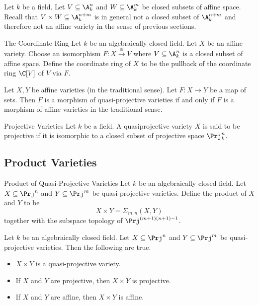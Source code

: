 \documentclass[a4paper]{article}
\begin{document}
Let $k$ be a field. Let $V\subseteq\A_k^n$ and $W\subseteq\A_k^m$ be closed subsets of affine space. Recall that $V\times W\subseteq\A_k^{n+m}$ is in general not a closed subset of $\A_k^{n+m}$ and therefore not an affine variety in the sense of previous sections. 

\begin{defn}{The Coordinate Ring}{} Let $k$ be an algebraically closed field. Let $X$ be an affine variety. Choose an isomorphism $F:X\overset{\cong}{\longrightarrow}V$ where $V\subseteq\A_k^n$ is a closed subset of affine space. Define the coordinate ring of $X$ to be the pullback of the coordinate ring $\C[V]$ of $V$ via $F$. 
\end{defn}

\begin{prp}{}{} Let $X,Y$ be affine varieties (in the traditional sense). Let $F:X\to Y$ be a map of sets. Then $F$ is a morphism of quasi-projective varieties if and only if $F$ is a morphism of affine varieties in the traditional sense. 
\end{prp}

\begin{defn}{Projective Varieties}{} Let $k$ be a field. A quasiprojective variety $X$ is said to be projective if it is isomorphic to a closed subset of projective space $\Prj_k^n$. 
\end{defn}

\subsection{Product Varieties}
\begin{defn}{Product of Quasi-Projective Varieties}{} Let $k$ be an algebraically closed field. Let $X\subseteq\Prj^n$ and $Y\subseteq\Prj^m$ be quasi-projective varieties. Define the product of $X$ and $Y$ to be $$X\times Y=\Sigma_{m,n}(X,Y)$$ together with the subspace topology of $\Prj^{(m+1)(n+1)-1}$. 
\end{defn}

\begin{lmm}{}{} Let $k$ be an algebraically closed field. Let $X\subseteq\Prj^n$ and $Y\subseteq\Prj^m$ be quasi-projective varieties. Then the following are true. 
\begin{itemize}
\item $X\times Y$ is a quasi-projective variety. 
\item If $X$ and $Y$ are projective, then $X\times Y$ is projective. 
\item If $X$ and $Y$ are affine, then $X\times Y$ is affine. 
\end{itemize}
\end{lmm}
\end{document}

